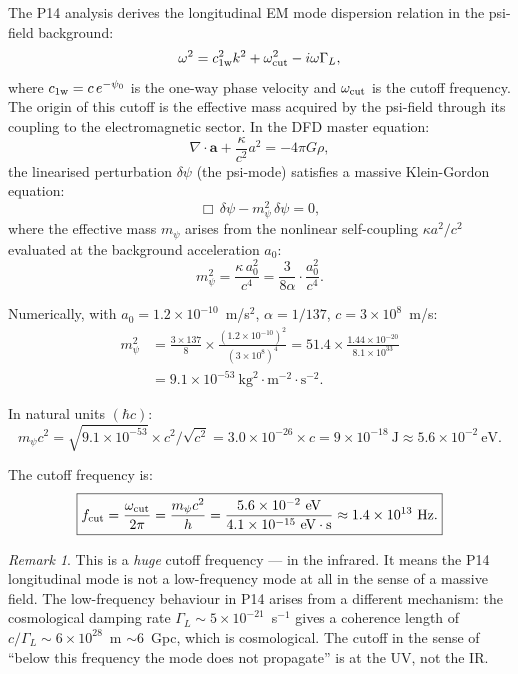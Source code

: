 \documentclass[11pt]{article}
\theoremstyle{definition}
\theoremstyle{remark}
\newtheorem{remark}{Remark}[section]
\newcommand{\ee}[1]{\times 10^{#1}}
\newcommand{\avec}{\mathbf{a}}
\newcommand{\alphafine}{\alpha}
\begin{document}
The P14 analysis derives the longitudinal EM mode dispersion relation in the
psi-field background:
\begin{equation}
\omega^2 = c_{\rm 1w}^2 k^2 + \omega_{\rm cut}^2 - i\omega\Gamma_L,
\end{equation}
where $c_{\rm 1w} = c\,e^{-\psi_0}$ is the one-way phase velocity and
$\omega_{\rm cut}$ is the cutoff frequency. The origin of this cutoff is the
effective mass acquired by the psi-field through its coupling to the
electromagnetic sector. In the DFD master equation:
\begin{equation}
\nabla\cdot\avec + \frac{\kappa}{c^2}a^2 = -4\pi G\rho,
\end{equation}
the linearised perturbation $\delta\psi$ (the psi-mode) satisfies a massive
Klein-Gordon equation:
\begin{equation}
\Box\,\delta\psi - m_\psi^2\,\delta\psi = 0,
\end{equation}
where the effective mass $m_\psi$ arises from the nonlinear self-coupling
$\kappa a^2/c^2$ evaluated at the background acceleration $a_0$:
\begin{equation}
\label{eq:psi-mass}
m_\psi^2 = \frac{\kappa\,a_0^2}{c^4} = \frac{3}{8\alphafine}\cdot
\frac{a_0^2}{c^4}.
\end{equation}

Numerically, with $a_0 = 1.2\ee{-10}$~m/s$^2$, $\alphafine = 1/137$,
$c = 3\ee{8}$~m/s:
\begin{align}
m_\psi^2 &= \frac{3 \times 137}{8} \times \frac{(1.2\ee{-10})^2}
{(3\ee{8})^4} = 51.4 \times \frac{1.44\ee{-20}}{8.1\ee{33}} \nonumber\\
&= 9.1\ee{-53}~\text{kg}^2\cdot\text{m}^{-2}\cdot\text{s}^{-2}.
\end{align}

In natural units $(\hbar c)$:
\begin{equation}
m_\psi c^2 = \sqrt{9.1\ee{-53}} \times c^2 / \sqrt{c^2} = 3.0\ee{-26}
\times c = 9\ee{-18}~\text{J} \approx 5.6\ee{-2}~\text{eV}.
\end{equation}

The cutoff frequency is:
\begin{equation}
\label{eq:fcut}
\boxed{
f_{\rm cut} = \frac{\omega_{\rm cut}}{2\pi} = \frac{m_\psi c^2}{h}
= \frac{5.6\ee{-2}~\text{eV}}{4.1\ee{-15}~\text{eV}\cdot\text{s}}
\approx 1.4\ee{13}~\text{Hz}.
}
\end{equation}

\begin{remark}
This is a \emph{huge} cutoff frequency --- in the infrared. It means the
P14 longitudinal mode is not a low-frequency mode at all in the sense of a
massive field. The low-frequency behaviour in P14 arises from a different
mechanism: the cosmological damping rate $\Gamma_L \sim 5\ee{-21}$~s$^{-1}$
gives a coherence length of $c/\Gamma_L \sim 6\ee{28}$~m $\sim 6$~Gpc, which
is cosmological. The cutoff in the sense of ``below this frequency the mode
does not propagate'' is at the UV, not the IR.
\end{remark}
\end{document}
